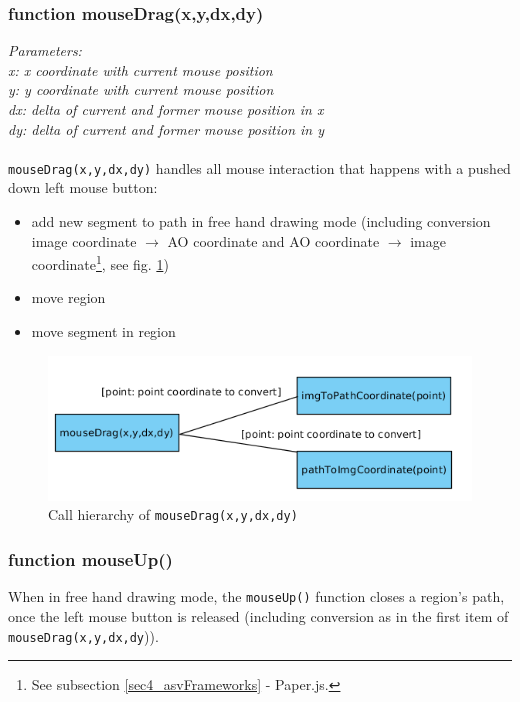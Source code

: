 \subsubsection{function mouseDrag(x,y,dx,dy)}
\emph{Parameters:\\
	x: x coordinate with current mouse position\\
	y: y coordinate with current mouse position\\
	dx: delta of current and former mouse position in x \\
	dy: delta of current and former mouse position in y\\ \\
}
\texttt{mouseDrag(x,y,dx,dy)} handles all mouse interaction that happens with a pushed down left mouse button:
\begin{itemize}
	\item add new segment to path in free hand drawing mode (including conversion image coordinate $\rightarrow$ AO coordinate and AO coordinate $\rightarrow$ image coordinate\footnote{
		See subsection \ref{sec4_asvFrameworks} - Paper.js.
	}, see fig. \ref{figB_mouseDrag})
	\item move region
	\item move segment in region
\end{itemize}

\begin{figure}[H]
	\begin{center}
		\includegraphics[scale=0.5]{img/ch_mouseDrag.png}
		\caption{Call hierarchy of \texttt{mouseDrag(x,y,dx,dy)}}
		\label{figB_mouseDrag}
	\end{center}
\end{figure}


\subsubsection{function mouseUp()}
When in free hand drawing mode, the \texttt{mouseUp()} function closes a region's path, once the left mouse button is released (including conversion as in the first item of \texttt{mouseDrag(x,y,dx,dy})).

